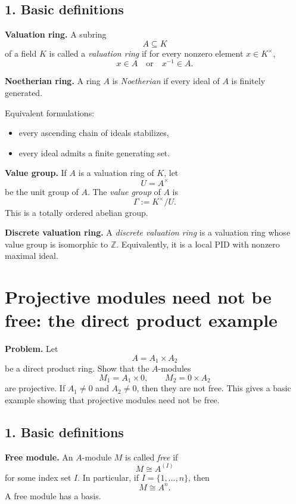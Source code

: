 \documentclass[12pt,a4paper]{article}
\theoremstyle{notespace}
\begin{document}
\subsection{1. Basic definitions}

\textbf{Valuation ring.}
A subring
\[
A\subseteq K
\]
of a field \(K\) is called a \emph{valuation ring} if for every nonzero element \(x\in K^\times\),
\[
x\in A
\quad \text{or} \quad
x^{-1}\in A.
\]

\textbf{Noetherian ring.}
A ring \(A\) is \emph{Noetherian} if every ideal of \(A\) is finitely generated.

Equivalent formulations:
\begin{itemize}
	\item every ascending chain of ideals stabilizes,
	\item every ideal admits a finite generating set.
\end{itemize}

\textbf{Value group.}
If \(A\) is a valuation ring of \(K\), let
\[
U=A^\times
\]
be the unit group of \(A\). The \emph{value group} of \(A\) is
\[
\Gamma:=K^\times/U.
\]
This is a totally ordered abelian group.

\textbf{Discrete valuation ring.}
A \emph{discrete valuation ring} is a valuation ring whose value group is isomorphic to \(\mathbb Z\). Equivalently, it is a local PID with nonzero maximal ideal.

\section{Projective modules need not be free: the direct product example}

\textbf{Problem.}
Let
\[
A=A_1\times A_2
\]
be a direct product ring. Show that the \(A\)-modules
\[
M_1=A_1\times 0,
\qquad
M_2=0\times A_2
\]
are projective. If \(A_1\neq 0\) and \(A_2\neq 0\), then they are not free. This gives a basic example showing that projective modules need not be free.

\subsection{1. Basic definitions}

\textbf{Free module.}
An \(A\)-module \(M\) is called \emph{free} if
\[
M\cong A^{(I)}
\]
for some index set \(I\). In particular, if \(I=\{1,\dots,n\}\), then
\[
M\cong A^n.
\]
A free module has a basis.

\medskip
\end{document}
